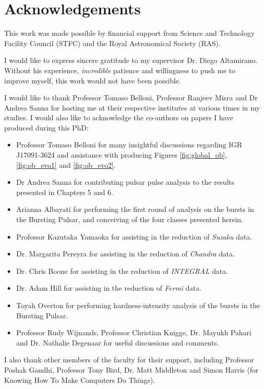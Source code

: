 \chapter*{Acknowledgements}


\par This work was made possible by financial support from Science and Technology Facility Council (STFC) and the Royal Astronomical Society (RAS).
\par I would like to express sincere gratitude to my supervisor Dr. Diego Altamirano.  Without his experience, \textit{incredible} patience and willingness to push me to improve myself, this work would not have been possible.
\par I would like to thank Professor Tomaso Belloni, Professor Ranjeev Misra and Dr Andrea Sanna for hosting me at their respective institutes at various times in my studies.  I would also like to acknowledge the co-authors on papers I have produced during this PhD:
\begin{itemize}
\item Professor Tomaso Belloni for many insightful discussions regarding IGR J17091-3624 and assistance with producing Figures \ref{fig:global_ob}, \ref{fig:ob_evo1} and \ref{fig:ob_evo2}.
\item Dr Andrea Sanna for contributing pulsar pulse analysis to the results presented in Chapters 5 and 6.
\item Arianna Albayati for performing the first round of analysis on the bursts in the Bursting Pulsar, and conceiving of the four classes presented herein.
\item Professor Kazutaka Yamaoka for assisting in the reduction of \textit{Suzaku} data.
\item Dr. Margarita Pereyra for assisting in the reduction of \textit{Chandra} data.
\item Dr. Chris Boone for assisting in the reduction of \textit{INTEGRAL} data.
\item Dr. Adam Hill for assisting in the reduction of \textit{Fermi} data.
\item Toyah Overton for performing hardness-intensity analysis of the bursts in the Bursting Pulsar.
\item Professor Rudy Wijnands, Professor Christian Knigge, Dr. Mayukh Pahari and Dr. Nathalie Degenaar for useful discussions and comments.
\end{itemize}
\par I also thank other members of the faculty for their support, including Professor Poshak Gandhi, Professor Tony Bird, Dr. Matt Middleton and Simon Harris (for Knowing How To Make Computers Do Things).
